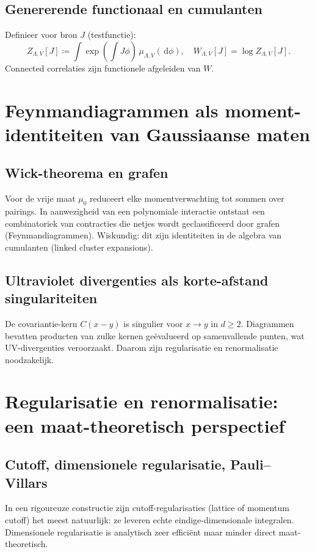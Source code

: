 \documentclass[11pt,a4paper,oneside]{book}
\theoremstyle{plain}
\theoremstyle{definition}
\renewcommand{\dd}{\,\mathrm{d}}
\begin{document}
	\section{Genererende functionaal en cumulanten}
	Definieer voor bron $J$ (testfunctie):
	\[
	Z_{\Lambda,V}[J]\coloneqq \int \exp\left(\int J\phi \right)\,\mu_{\Lambda,V}(\dd\phi),
	\quad
	W_{\Lambda,V}[J]=\log Z_{\Lambda,V}[J].
	\]
	Connected correlaties zijn functionele afgeleiden van $W$.
	
	\chapter{Feynmandiagrammen als moment-identiteiten van Gaussiaanse maten}
	
	\section{Wick-theorema en grafen}
	Voor de vrije maat $\mu_0$ reduceert elke momentverwachting tot sommen over pairings.
	In aanwezigheid van een polynomiale interactie ontstaat een combinatoriek van contracties die netjes wordt geclassificeerd door grafen
	(Feynmandiagrammen). Wiskundig: dit zijn identiteiten in de algebra van cumulanten (linked cluster expansions).
	
	\section{Ultraviolet divergenties als korte-afstand singulariteiten}
	De covariantie-kern $C(x-y)$ is singulier voor $x\to y$ in $d\ge 2$.
	Diagrammen bevatten producten van zulke kernen geëvalueerd op samenvallende punten, wat UV-divergenties veroorzaakt.
	Daarom zijn regularisatie en renormalisatie noodzakelijk.
	
	\chapter{Regularisatie en renormalisatie: een maat-theoretisch perspectief}
	
	\section{Cutoff, dimensionele regularisatie, Pauli--Villars}
	In een rigoureuze constructie zijn cutoff-regularisaties (lattice of momentum cutoff) het meest natuurlijk: ze leveren echte eindige-dimensionale integralen.
	Dimensionele regularisatie is analytisch zeer efficiënt maar minder direct maat-theoretisch.
	
\end{document}
